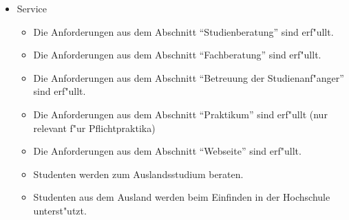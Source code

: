 \begin{itemize}
\item Service
 \begin{itemize}
 \item Die Anforderungen aus dem Abschnitt "`Studienberatung"' sind erf"ullt.
 \item Die Anforderungen aus dem Abschnitt "`Fachberatung"' sind erf"ullt.
 \item Die Anforderungen aus dem Abschnitt "`Betreuung der Studienanf"anger"' sind erf"ullt.
 \item Die Anforderungen aus dem Abschnitt "`Praktikum"' sind erf"ullt (nur relevant f"ur Pflichtpraktika)
 \item Die Anforderungen aus dem Abschnitt "`Webseite"' sind erf"ullt.
 \item Studenten werden zum Auslandsstudium beraten.
 \item Studenten aus dem Ausland werden beim Einfinden in der Hochschule unterst"utzt.
 \end{itemize}

\end{itemize}
